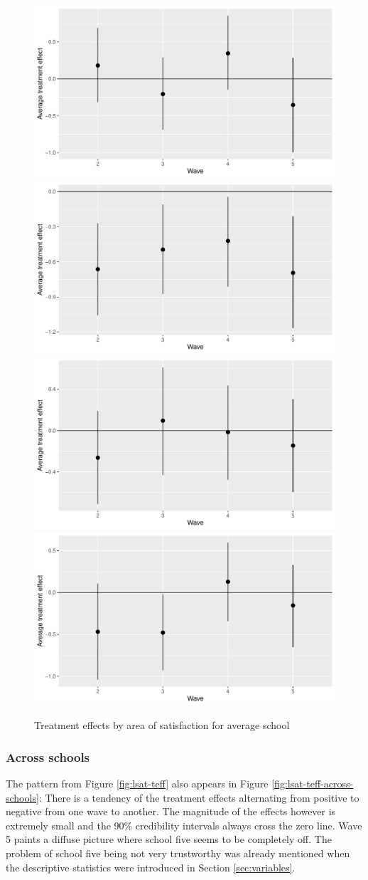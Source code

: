 \documentclass[a4, 12pt]{article}
\begin{document}
\begin{figure}[H]
\includegraphics[width=0.5\linewidth,]{../figures/lsat_teff} \includegraphics[width=0.5\linewidth,]{../figures/sat_friends_teff} \includegraphics[width=0.5\linewidth,]{../figures/sat_class_teff} \includegraphics[width=0.5\linewidth,]{../figures/sat_school_teff} \caption{Treatment effects by area of satisfaction for average school}\label{fig:sat-teff}
\end{figure}

\hypertarget{across-schools}{%
\subsubsection{Across schools}\label{across-schools}}

The pattern from Figure \ref{fig:lsat-teff} also appears in Figure \ref{fig:lsat-teff-across-schools}: There is a tendency of the treatment effects alternating from positive to negative from one wave to another. The magnitude of the effects however is extremely small and the 90\% credibility intervals always cross the zero line. Wave 5 paints a diffuse picture where school five seems to be completely off. The problem of school five being not very trustworthy was already mentioned when the descriptive statistics were introduced in Section \ref{sec:variables}.
\end{document}
